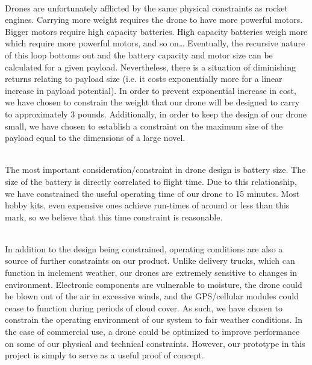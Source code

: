 \documentclass[12pt]{extarticle}
\begin{document}
\ \\
Drones are unfortunately afflicted by the same physical constraints as rocket engines.  Carrying more weight requires the drone to have more powerful motors.  Bigger motors require high capacity batteries.  High capacity batteries weigh more which require more powerful motors, and so on…  Eventually, the recursive nature of this loop bottoms out and the battery capacity and motor size can be calculated for a given payload.  Nevertheless, there is a situation of diminishing returns relating to payload size (i.e. it costs exponentially more for a linear increase in payload potential).  In order to prevent exponential increase in cost, we have chosen to constrain the weight that our drone will be designed to carry to approximately 3 pounds.  Additionally, in order to keep the design of our drone small, we have chosen to establish a constraint on the maximum size of the payload equal to the dimensions of a large novel.  

\ \\
The most important consideration/constraint in drone design is battery size.  The size of the battery is directly correlated to flight time.  Due to this relationship, we have constrained the useful operating time of our drone to 15 minutes.  Most hobby kits, even expensive ones achieve run-times of around or less than this mark, so we believe that this time constraint is reasonable.    

\ \\
In addition to the design being constrained, operating conditions are also a source of further constraints on our product.  Unlike delivery trucks, which can function in inclement weather, our drones are extremely sensitive to changes in environment.  Electronic components are vulnerable to moisture, the drone could be blown out of the air in excessive winds, and the GPS/cellular modules could cease to function during periods of cloud cover.  As such, we have chosen to constrain the operating environment of our system to fair weather conditions.  In the case of commercial use, a drone could be optimized to improve performance on some of our physical and technical constraints.  However, our prototype in this project is simply to serve as a useful proof of concept. 
\end{document}
